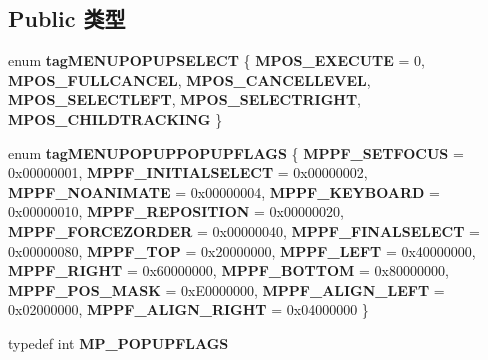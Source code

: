 \subsection*{Public 类型}
\begin{DoxyCompactItemize}
\item 
\mbox{\label{interface_i_menu_popup_a784532ac1fda3d9a074128f98a268a1c}} 
enum {\bfseries tag\+M\+E\+N\+U\+P\+O\+P\+U\+P\+S\+E\+L\+E\+CT} \{ \newline
{\bfseries M\+P\+O\+S\+\_\+\+E\+X\+E\+C\+U\+TE} = 0, 
{\bfseries M\+P\+O\+S\+\_\+\+F\+U\+L\+L\+C\+A\+N\+C\+EL}, 
{\bfseries M\+P\+O\+S\+\_\+\+C\+A\+N\+C\+E\+L\+L\+E\+V\+EL}, 
{\bfseries M\+P\+O\+S\+\_\+\+S\+E\+L\+E\+C\+T\+L\+E\+FT}, 
\newline
{\bfseries M\+P\+O\+S\+\_\+\+S\+E\+L\+E\+C\+T\+R\+I\+G\+HT}, 
{\bfseries M\+P\+O\+S\+\_\+\+C\+H\+I\+L\+D\+T\+R\+A\+C\+K\+I\+NG}
 \}
\item 
\mbox{\label{interface_i_menu_popup_adfede2e652aa09b68dc17c947ad5302e}} 
enum {\bfseries tag\+M\+E\+N\+U\+P\+O\+P\+U\+P\+P\+O\+P\+U\+P\+F\+L\+A\+GS} \{ \newline
{\bfseries M\+P\+P\+F\+\_\+\+S\+E\+T\+F\+O\+C\+US} = 0x00000001, 
{\bfseries M\+P\+P\+F\+\_\+\+I\+N\+I\+T\+I\+A\+L\+S\+E\+L\+E\+CT} = 0x00000002, 
{\bfseries M\+P\+P\+F\+\_\+\+N\+O\+A\+N\+I\+M\+A\+TE} = 0x00000004, 
{\bfseries M\+P\+P\+F\+\_\+\+K\+E\+Y\+B\+O\+A\+RD} = 0x00000010, 
\newline
{\bfseries M\+P\+P\+F\+\_\+\+R\+E\+P\+O\+S\+I\+T\+I\+ON} = 0x00000020, 
{\bfseries M\+P\+P\+F\+\_\+\+F\+O\+R\+C\+E\+Z\+O\+R\+D\+ER} = 0x00000040, 
{\bfseries M\+P\+P\+F\+\_\+\+F\+I\+N\+A\+L\+S\+E\+L\+E\+CT} = 0x00000080, 
{\bfseries M\+P\+P\+F\+\_\+\+T\+OP} = 0x20000000, 
\newline
{\bfseries M\+P\+P\+F\+\_\+\+L\+E\+FT} = 0x40000000, 
{\bfseries M\+P\+P\+F\+\_\+\+R\+I\+G\+HT} = 0x60000000, 
{\bfseries M\+P\+P\+F\+\_\+\+B\+O\+T\+T\+OM} = 0x80000000, 
{\bfseries M\+P\+P\+F\+\_\+\+P\+O\+S\+\_\+\+M\+A\+SK} = 0x\+E0000000, 
\newline
{\bfseries M\+P\+P\+F\+\_\+\+A\+L\+I\+G\+N\+\_\+\+L\+E\+FT} = 0x02000000, 
{\bfseries M\+P\+P\+F\+\_\+\+A\+L\+I\+G\+N\+\_\+\+R\+I\+G\+HT} = 0x04000000
 \}
\item 
\mbox{\label{interface_i_menu_popup_a60b6dc45e580d8da2f6938fbbac2344a}} 
typedef int {\bfseries M\+P\+\_\+\+P\+O\+P\+U\+P\+F\+L\+A\+GS}
\end{DoxyCompactItemize}
